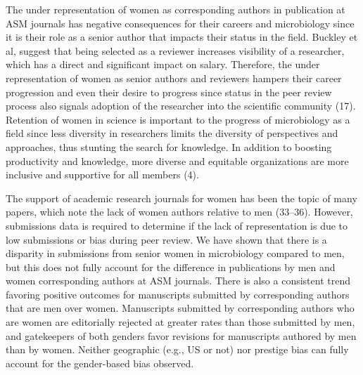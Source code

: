 \documentclass[11pt,]{article}
\begin{document}
The under representation of women as corresponding authors in
publication at ASM journals has negative consequences for their careers
and microbiology since it is their role as a senior author that impacts
their status in the field. Buckley et al, suggest that being selected as
a reviewer increases visibility of a researcher, which has a direct and
significant impact on salary. Therefore, the under representation of
women as senior authors and reviewers hampers their career progression
and even their desire to progress since status in the peer review
process also signals adoption of the researcher into the scientific
community (17). Retention of women in science is important to the
progress of microbiology as a field since less diversity in researchers
limits the diversity of perspectives and approaches, thus stunting the
search for knowledge. In addition to boosting productivity and
knowledge, more diverse and equitable organizations are more inclusive
and supportive for all members (4).

The support of academic research journals for women has been the topic
of many papers, which note the lack of women authors relative to men
(33--36). However, submissions data is required to determine if the lack
of representation is due to low submissions or bias during peer review.
We have shown that there is a disparity in submissions from senior women
in microbiology compared to men, but this does not fully account for the
difference in publications by men and women corresponding authors at ASM
journals. There is also a consistent trend favoring positive outcomes
for manuscripts submitted by corresponding authors that are men over
women. Manuscripts submitted by corresponding authors who are women are
editorially rejected at greater rates than those submitted by men, and
gatekeepers of both genders favor revisions for manuscripts authored by
men than by women. Neither geographic (e.g., US or not) nor prestige
bias can fully account for the gender-based bias observed.
\end{document}
